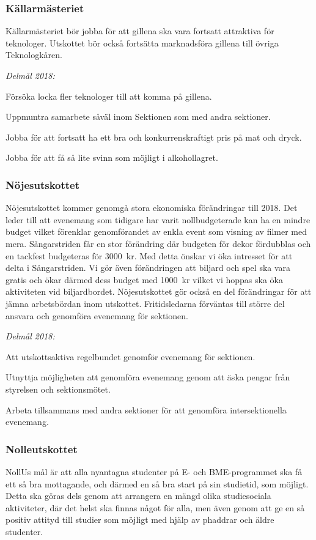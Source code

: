 \documentclass[../_main/handlingar.tex]{subfiles}
\begin{document}
\subsubsection*{Källarmästeriet}
Källarmästeriet bör jobba för att gillena ska vara fortsatt attraktiva för teknologer. Utskottet bör också fortsätta marknadsföra gillena till övriga Teknologkåren.

\emph{Delmål 2018:}
\begin{dashlist}
	\item Försöka locka fler teknologer till att komma på gillena.
	\item Uppmuntra samarbete såväl inom Sektionen som med andra sektioner.
	\item Jobba för att fortsatt ha ett bra och konkurrenskraftigt pris på mat och dryck.
	\item Jobba för att få så lite svinn som möjligt i alkohollagret.
\end{dashlist}
\newpage
\subsubsection*{Nöjesutskottet}
Nöjesutskottet kommer genomgå stora ekonomiska förändringar till 2018. Det leder till att evenemang som tidigare har varit nollbudgeterade kan ha en mindre budget vilket förenklar genomförandet av enkla event som visning av filmer med mera. Sångarstriden får en stor förändring där budgeten för dekor fördubblas och en tackfest budgeteras för \SI{3000}{kr}. Med detta önskar vi öka intresset för att delta i Sångarstriden. Vi gör även förändringen att biljard och spel ska vara gratis och ökar därmed dess budget med \SI{1000}{kr} vilket vi hoppas ska öka aktiviteten vid biljardbordet. Nöjesutskottet gör också en del förändringar för att jämna arbetsbördan inom utskottet. Fritidsledarna förväntas till större del ansvara och genomföra evenemang för sektionen.

\emph{Delmål 2018:}
\begin{dashlist}
	\item Att utskottsaktiva regelbundet genomför evenemang för sektionen.
	\item Utnyttja möjligheten att genomföra evenemang genom att äska pengar från styrelsen och sektionsmötet.
	\item Arbeta tillsammans med andra sektioner för att genomföra intersektionella evenemang.
\end{dashlist}

\subsubsection*{Nolleutskottet}
NollUs mål är att alla nyantagna studenter på E- och BME-programmet ska få ett så bra mottagande, och därmed en så bra start på sin studietid, som möjligt. Detta ska göras dels genom att arrangera en mängd olika studiesociala aktiviteter, där det helst ska finnas något för alla, men även genom att ge en så positiv attityd till studier som möjligt med hjälp av phaddrar och äldre studenter.
\end{document}
